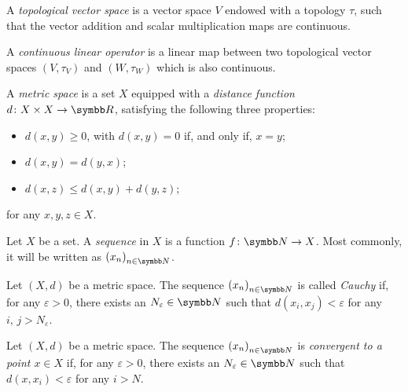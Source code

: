 \begin{definition}
A \emph{topological vector space} is a vector space \(V\) endowed with a topology \(\tau\), such that the vector addition and scalar multiplication maps are continuous.
\end{definition}

\begin{definition}
A \emph{continuous linear operator} is a linear map between two topological vector spaces \(\left(V, \tau_V\right)\) and \(\left(W, \tau_W\right)\) which is also continuous.
\end{definition}

\begin{definition}
A \emph{metric space} is a set \(X\) equipped with a \emph{distance function} \(d \colon X \times X \to \reals\), satisfying the following three properties:
\begin{itemize}
    \item \(d(x, y) \geq 0\), with \(d(x, y) = 0\) if, and only if, \(x = y\);
    \item \(d(x, y) = d(y, x)\);
    \item \(d(x, z) \leq d(x, y) + d(y, z)\);
\end{itemize}
for any \(x, y, z \in X\).
\end{definition}

\begin{definition}[Sequence]
Let \(X\) be a set. A \emph{sequence} in \(X\) is a function \(f \colon \naturals \to X\). Most commonly, it will be written as \(\left(x_n\right)_{n \in \naturals}\).
\end{definition}

\begin{definition}
Let \((X, d)\) be a metric space. The sequence \(\left(x_n\right)_{n \in \naturals}\) is called \emph{Cauchy} if, for any \(\varepsilon > 0\), there exists an \(N_{\varepsilon} \in \naturals\) such that \(d\left(x_i, x_j\right) < \varepsilon\) for any \(i, \, j > N_{\varepsilon}\).
\end{definition}

\begin{definition}[Convergence]
Let \((X, d)\) be a metric space. The sequence \(\left(x_n\right)_{n \in \naturals}\) is \emph{convergent to a point \(x \in X\)} if, for any \(\varepsilon > 0\), there exists an \(N_{\varepsilon} \in \naturals\) such that \(d\left(x, x_i\right) < \varepsilon\) for any \(i > N\).
\end{definition}

